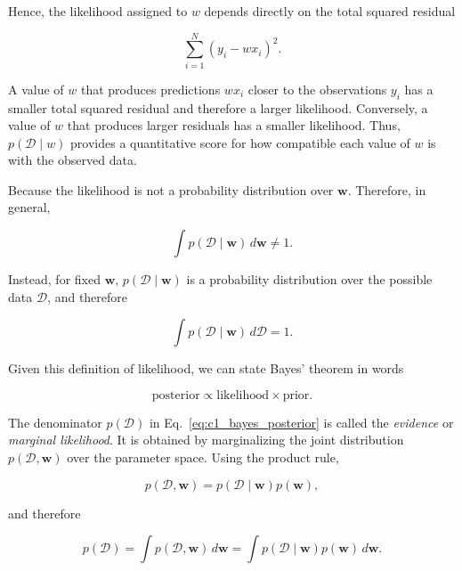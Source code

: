 \documentclass[10pt,twocolumn]{memoir}
\begin{document}
Hence, the likelihood assigned to $w$ depends directly on the total squared residual

\begin{equation}
    \sum_{i=1}^{N}(y_i-wx_i)^2.
\end{equation}

A value of $w$ that produces predictions $wx_i$ closer to the observations $y_i$ has a smaller total squared residual and therefore a larger likelihood. Conversely, a value of $w$ that produces larger residuals has a smaller likelihood. Thus, $p(\mathcal{D}\mid w)$ provides a quantitative score for how compatible each value of $w$ is with the observed data.

Because the likelihood is not a probability distribution over $\mathbf{w}$. Therefore, in general,

\begin{equation}
    \int p(\mathcal{D}\mid\mathbf{w})\,d\mathbf{w} \neq 1.
\end{equation}

Instead, for fixed $\mathbf{w}$, $p(\mathcal{D}\mid\mathbf{w})$ is a probability distribution over the possible data $\mathcal{D}$, and therefore

\begin{equation}
    \int p(\mathcal{D}\mid\mathbf{w})\,d\mathcal{D} = 1.
\end{equation}

Given this definition of likelihood, we can state Bayes' theorem in words

\begin{equation}
    \text{posterior} \propto \text{likelihood} \times \text{prior}.
\end{equation}

The denominator $p(\mathcal{D})$ in Eq.~\ref{eq:c1_bayes_posterior} is called the \textit{evidence} or \textit{marginal likelihood}. It is obtained by marginalizing the joint distribution $p(\mathcal{D},\mathbf{w})$ over the parameter space. Using the product rule,

\begin{equation}
    p(\mathcal{D},\mathbf{w}) = p(\mathcal{D}\mid\mathbf{w})p(\mathbf{w}),
\end{equation}

and therefore

\begin{equation}
    p(\mathcal{D}) = \int p(\mathcal{D},\mathbf{w}) \, d\mathbf{w} = \int p(\mathcal{D}\mid\mathbf{w})p(\mathbf{w}) \, d\mathbf{w}.
\end{equation}
\end{document}
